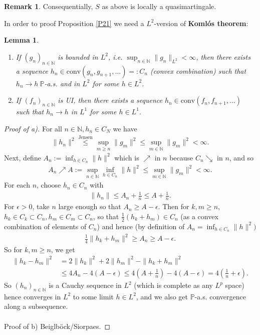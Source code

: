 \documentclass[12pt,a4paper, twoside]{article}
\newtheorem{lem}{Lemma}[section]
\theoremstyle{definition}
\newtheorem{rem}{Remark}[section]
\newcommand{\PP}{\mathbb{P}} %
\begin{document}
\begin{rem} Consequentially, $S$ as above is locally a quasimartingale. 
\end{rem}
In order to proof Proposition \ref{P21} we need a $L^2$-version of \textbf{Komlós theorem}: 
\begin{lem} \label{L22} \
\begin{enumerate}[label=(\alph*)]
\item If $(g_n)_{n \in \mathbb{N}}$ is bounded in $L^2$, i.e. $\sup_{n \in \mathbb{N}} \|g_n\|_{L^2}< \infty$, then there exists a sequence $h_n \in \text{conv}(g_n,g_{n+1}, \dots )=:C_n$ (convex combination) such that $h_n \to h \ \PP$-a.s. and in $L^2$ for some $h \in L^2$. 
\item If $(f_n)_{n \in \mathbb{N}}$ is UI, then there exists a sequence $h_n \in \text{conv}(f_n, f_{n+1}, \dots )$ such that $h_n \to h$ in $L^1$ for some $h \in L^1$. 
\end{enumerate}
\end{lem}
\newpage
\begin{proof}[Proof of a)] For all $n \in \mathbb{N}, h_n \in C_N$ we have
\begin{align*}
\|h_n\|^2 \overset{\text{Jensen}}\leq \sup_{m \geq n } \|g_m\|^2 \leq \sup_{m \in \mathbb{N}} \|g_m\|^2 < \infty.
\end{align*}
Next, define $A_n:= \inf_{h \in C_n} \|h\|^2$ which is $\nearrow$ in $n$ because $C_n \searrow$ in $n$, and so 
\begin{align*}
A_n \nearrow A := \sup_{n \in \mathbb{N}} \inf_{h \in C_n} \|h\|^2 \leq \sup_{m \in \mathbb{N}} \|g_m\|^2 < \infty.
\end{align*}
For each $n$, choose $h_n \in C_n$ with 
\begin{align*}
\|h_n\| \leq A_n + \frac{1}{n} \leq A +\frac{1}{n}.
\end{align*}
For $\epsilon>0$, take $n$ large enough so that $A_n \geq A- \epsilon$. Then for $k,m \geq n$, $h_k \in C_k \subset C_n, h_m \in C_m \subset C_n$, so that $\frac{1}{2}(h_k+h_m) \in C_n$ (as a convex combination of elements of $C_n$) and hence (by definition of $A_n= \inf_{h \in C_n} \|h\|^2)$
\begin{align*}
\frac{1}{4} \|h_k + h_m\|^2 \geq A_n \geq A- \epsilon.
\end{align*}
So for $k,m \geq n$, we get 
\begin{align*}
\|h_k-h_m\|^2 &= 2 \|h_k\|^2 + 2 \|h_m\|^2 - \|h_k + h_m\|^2  \\
& \leq 4 A_n - 4(A- \epsilon) \leq 4\left(A+ \frac{1}{n}\right) -4(A- \epsilon) = 4 \left( \frac{1}{n} + \epsilon \right).
\end{align*}
So $(h_n)_{n \in \mathbb{N}}$ is a Cauchy sequence in $L^2$ (which is complete as any $L^p$ space) hence converges in $L^2$ to some limit $h \in L^2$, and we also get $\PP$-a.s. convergence along a subsequence. 
\\
\\
Proof of b) Beiglböck/Siorpaes.
\end{proof}
\end{document}
